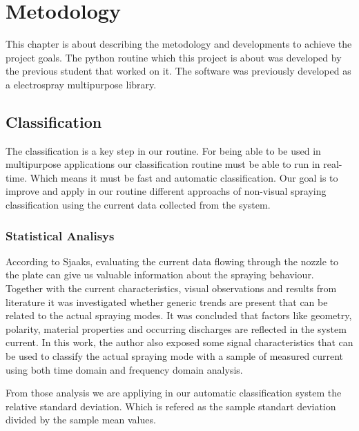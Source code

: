 \chapter{Metodology}
\label{chap:Metodology}

This chapter is about describing the metodology and developments to achieve the project goals. 
The python routine which this project is about was developed by the previous student that worked on it.\cite{Monica}
The software was previously developed as a electrospray multipurpose library\cite{Monica}. 


\section{Classification}
\label{sec:section_classification}

The classification is a key step in our routine. For being able to be used in multipurpose applications our classification routine must be able to run in real-time. Which means it must be fast and automatic classification.
Our goal is to improve and apply in our routine different approachs of non-visual spraying classification using the current data collected from the system.

\subsection{Statistical Analisys}

 According to Sjaaks\cite{Sjaaks}, evaluating the current data flowing through the nozzle to the plate can give us valuable information about the spraying behaviour.
 Together with the current characteristics, visual observations and results from literature it was investigated whether generic trends are present that can be related to the actual spraying modes.
 It was concluded that factors like geometry, polarity, material properties and occurring discharges are reflected in the system current.
In this work, the author also exposed some signal characteristics that can be used to classify the actual spraying mode with a sample of measured current using both time domain and frequency domain analysis.

From those analysis we are appliying in our automatic classification system the relative standard deviation. Which is refered as the sample standart deviation divided by the sample mean values.

